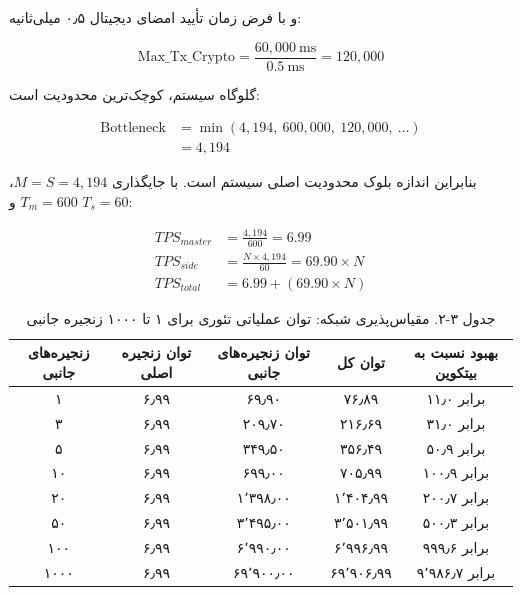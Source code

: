 و با فرض زمان تأیید امضای دیجیتال ۰٫۵ میلی‌ثانیه:

\begin{latin}
\begin{equation}
\text{Max\_Tx\_Crypto} = \frac{60{,}000\ \text{ms}}{0.5\ \text{ms}} = 120{,}000
\end{equation}
\end{latin}

گلوگاه سیستم، کوچک‌ترین محدودیت است:

\begin{latin}
\begin{equation}
\begin{split}
\text{Bottleneck} &= \min(4{,}194,\ 600{,}000,\ 120{,}000,\ \ldots) \\
&= 4{,}194
\end{split}
\end{equation}
\end{latin}

بنابراین اندازه بلوک محدودیت اصلی سیستم است. با جایگذاری \(M = S = 4{,}194\)، \(T_m = 600\) و \(T_s = 60\):

\begin{latin}
\begin{align}
TPS_{master} &= \frac{4{,}194}{600} = 6.99 \\
TPS_{side} &= \frac{N \times 4{,}194}{60} = 69.90 \times N \\
TPS_{total} &= 6.99 + (69.90 \times N)
\end{align}
\end{latin}

\begin{table}[h]
\centering
\caption{جدول ۳-۲. مقیاس‌پذیری شبکه: توان عملیاتی تئوری برای ۱ تا ۱۰۰۰ زنجیره جانبی}
\label{tab:theoretical-max-tps}
\small
\begin{tabular}{|c|c|c|c|c|}
\hline
زنجیره‌های جانبی & توان زنجیره اصلی & توان زنجیره‌های جانبی & توان کل & بهبود نسبت به بیتکوین \\
\hline
۱ & ۶٫۹۹ & ۶۹٫۹۰ & ۷۶٫۸۹ & ۱۱٫۰ برابر \\
\hline
۳ & ۶٫۹۹ & ۲۰۹٫۷۰ & ۲۱۶٫۶۹ & ۳۱٫۰ برابر \\
\hline
۵ & ۶٫۹۹ & ۳۴۹٫۵۰ & ۳۵۶٫۴۹ & ۵۰٫۹ برابر \\
\hline
۱۰ & ۶٫۹۹ & ۶۹۹٫۰۰ & ۷۰۵٫۹۹ & ۱۰۰٫۹ برابر \\
\hline
۲۰ & ۶٫۹۹ & ۱٬۳۹۸٫۰۰ & ۱٬۴۰۴٫۹۹ & ۲۰۰٫۷ برابر \\
\hline
۵۰ & ۶٫۹۹ & ۳٬۴۹۵٫۰۰ & ۳٬۵۰۱٫۹۹ & ۵۰۰٫۳ برابر \\
\hline
۱۰۰ & ۶٫۹۹ & ۶٬۹۹۰٫۰۰ & ۶٬۹۹۶٫۹۹ & ۹۹۹٫۶ برابر \\
\hline
۱۰۰۰ & ۶٫۹۹ & ۶۹٬۹۰۰٫۰۰ & ۶۹٬۹۰۶٫۹۹ & ۹٬۹۸۶٫۷ برابر \\
\hline
\end{tabular}
\end{table}

